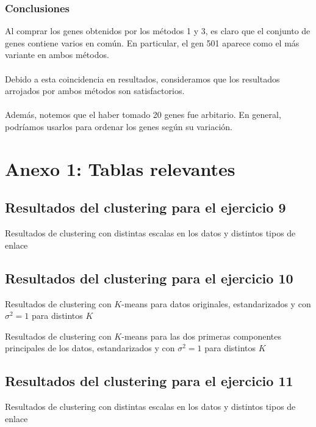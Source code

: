 \documentclass[11pt]{article}
\begin{document}
\subsubsection{Conclusiones}
Al comprar los genes obtenidos por los métodos 1 y 3, es claro que el conjunto de genes contiene varios en común. En particular, el gen 501 aparece como el más variante en ambos métodos.
\\
\\Debido a esta coincidencia en resultados, consideramos que los resultados arrojados por ambos métodos son satisfactorios.
\\
\\
Además, notemos que el haber tomado 20 genes fue arbitario. En general, podríamos usarlos para ordenar los genes según su variación.
\pagebreak
\section*{Anexo 1: Tablas relevantes}
\subsection*{Resultados del clustering para el ejercicio 9}

\begin{table}[H]
    \centering
    \centering
    \caption{Resultados de clustering con distintas escalas en los datos y distintos tipos de enlace}
    \label{2-clusresults}
\end{table}
\subsection*{Resultados del clustering para el ejercicio 10}

\begin{table}[H]
    \centering
    \centering
    \caption{Resultados de clustering con $K$-means para datos originales, estandarizados y con $\sigma^2 = 1$ para distintos $K$}
    \label{3-clusresults}
\end{table}

\begin{table}[H]
    \centering
    \centering
    \caption{Resultados de clustering con $K$-means para las dos primeras componentes principales de los datos, estandarizados y con $\sigma^2 = 1$ para distintos $K$}
    \label{3-clusresults-pca}
\end{table}
\subsection*{Resultados del clustering para el ejercicio 11}

\begin{table}[H]
    \centering
    \centering
    \caption{Resultados de clustering con distintas escalas en los datos y distintos tipos de enlace}
    \label{4-clusres}
\end{table}
\end{document}
